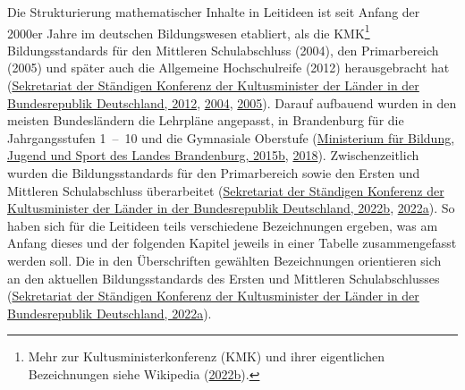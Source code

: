 \documentclass[
]{scrbook}
\theoremstyle{definition}
\theoremstyle{definition}
\theoremstyle{definition}
\theoremstyle{definition}
\theoremstyle{remark}
\begin{document}
Die Strukturierung mathematischer Inhalte in Leitideen ist seit Anfang der 2000er Jahre im deutschen Bildungswesen etabliert, als die KMK\footnote{Mehr zur Kultusministerkonferenz (KMK) und ihrer eigentlichen Bezeichnungen siehe Wikipedia (\protect\hyperlink{ref-dewiki:228417777}{2022b}).} Bildungsstandards für den Mittleren Schulabschluss (2004), den Primarbereich (2005) und später auch die Allgemeine Hochschulreife (2012) herausgebracht hat (\protect\hyperlink{ref-KMK:2012}{Sekretariat der Ständigen Konferenz der Kultusminister der Länder in der Bundesrepublik Deutschland, 2012}, \protect\hyperlink{ref-KMK:2004a}{2004}, \protect\hyperlink{ref-KMK2005}{2005}). Darauf aufbauend wurden in den meisten Bundesländern die Lehrpläne angepasst, in Brandenburg für die Jahrgangsstufen 1~--~10 und die Gymnasiale Oberstufe (\protect\hyperlink{ref-MinisteriumfurBildungJugendundSportdesLandesBrandenburg2015a}{Ministerium für Bildung, Jugend und Sport des Landes Brandenburg, 2015b}, \protect\hyperlink{ref-MinisteriumfurBildungJugendundSportdesLandesBrandenburg2018}{2018}). Zwischenzeitlich wurden die Bildungsstandards für den Primarbereich sowie den Ersten und Mittleren Schulabschluss überarbeitet (\protect\hyperlink{ref-SekretariatderStandigenKonferenzderKultusministerderLanderinderBundesrepublikDeutschland2022a}{Sekretariat der Ständigen Konferenz der Kultusminister der Länder in der Bundesrepublik Deutschland, 2022b}, \protect\hyperlink{ref-SekretariatderStandigenKonferenzderKultusministerderLanderinderBundesrepublikDeutschland2022}{2022a}). So haben sich für die Leitideen teils verschiedene Bezeichnungen ergeben, was am Anfang dieses und der folgenden Kapitel jeweils in einer Tabelle zusammengefasst werden soll. Die in den Überschriften gewählten Bezeichnungen orientieren sich an den aktuellen Bildungsstandards des Ersten und Mittleren Schulabschlusses (\protect\hyperlink{ref-SekretariatderStandigenKonferenzderKultusministerderLanderinderBundesrepublikDeutschland2022}{Sekretariat der Ständigen Konferenz der Kultusminister der Länder in der Bundesrepublik Deutschland, 2022a}).
\end{document}
